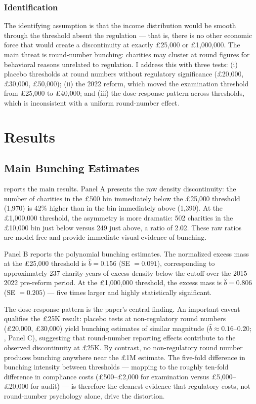 \documentclass[12pt]{article}
\begin{document}
\subsubsection*{Identification} The identifying assumption is that the income distribution would be smooth through the threshold absent the regulation --- that is, there is no other economic force that would create a discontinuity at exactly \pounds25,000 or \pounds1,000,000. The main threat is round-number bunching: charities may cluster at round figures for behavioral reasons unrelated to regulation. I address this with three tests: (i) placebo thresholds at round numbers without regulatory significance (\pounds20,000, \pounds30,000, \pounds50,000); (ii) the 2022 reform, which moved the examination threshold from \pounds25,000 to \pounds40,000; and (iii) the dose-response pattern across thresholds, which is inconsistent with a uniform round-number effect.


\section{Results}

\subsection{Main Bunching Estimates}

 reports the main results. Panel A presents the raw density discontinuity: the number of charities in the \pounds500 bin immediately below the \pounds25,000 threshold (1,970) is 42\% higher than in the bin immediately above (1,390). At the \pounds1,000,000 threshold, the asymmetry is more dramatic: 502 charities in the \pounds10,000 bin just below versus 249 just above, a ratio of 2.02. These raw ratios are model-free and provide immediate visual evidence of bunching.

Panel B reports the polynomial bunching estimates. The normalized excess mass at the \pounds25,000 threshold is $\hat{b} = 0.156$ (SE $= 0.091$), corresponding to approximately 237 charity-years of excess density below the cutoff over the 2015--2022 pre-reform period. At the \pounds1,000,000 threshold, the excess mass is $\hat{b} = 0.806$ (SE $= 0.205$) --- five times larger and highly statistically significant.

The dose-response pattern is the paper's central finding. An important caveat qualifies the \pounds25K result: placebo tests at non-regulatory round numbers (\pounds20,000, \pounds30,000) yield bunching estimates of similar magnitude ($\hat{b} \approx 0.16$--$0.20$; , Panel C), suggesting that round-number reporting effects contribute to the observed discontinuity at \pounds25K. By contrast, no non-regulatory round number produces bunching anywhere near the \pounds1M estimate. The five-fold difference in bunching intensity between thresholds --- mapping to the roughly ten-fold difference in compliance costs (\pounds500--\pounds2,000 for examination versus \pounds5,000--\pounds20,000 for audit) --- is therefore the cleanest evidence that regulatory costs, not round-number psychology alone, drive the distortion.
\end{document}
